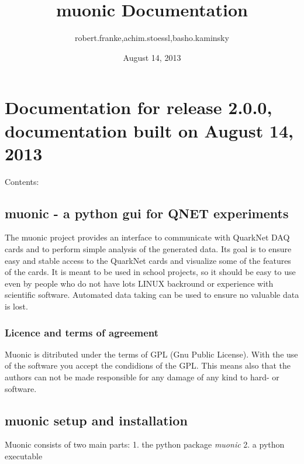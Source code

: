 \documentclass[letterpaper,10pt,english]{sphinxmanual}
\title{muonic Documentation}
\date{August 14, 2013}
\author{robert.franke,achim.stoessl,basho.kaminsky}
\begin{document}
\maketitle
\tableofcontents
{}\label{index::doc}



\chapter{Documentation for release 2.0.0, documentation built on August 14, 2013}
\label{index:welcome-to-muonic-documentation}\label{index:documentation-for-release-release-documentation-built-on-today}
Contents:


\section{muonic - a python gui for QNET experiments}
\label{intro::doc}\label{intro:muonic-a-python-gui-for-qnet-experiments}
The muonic project provides an interface to communicate with QuarkNet DAQ cards and to perform simple analysis of the generated data.
Its goal is to ensure easy and stable access to the QuarkNet cards and visualize some of the features of the cards. It is meant to be used in school projects, so it should be easy to use even by people who do not have lots LINUX backround or experience with scientific software. Automated data taking can be used to ensure no valuable data is lost.


\subsection{Licence and terms of agreement}
\label{intro:licence-and-terms-of-agreement}
Muonic is ditributed under the terms of GPL (Gnu Public License). With the use of the software you accept the condidions of the GPL. This means also that the authors can not be made responsible for any damage of any kind to hard- or software.


\section{muonic setup and installation}
\label{setup::doc}\label{setup:muonic-setup-and-installation}
Muonic consists of two main parts:
1. the python package \emph{muonic}
2. a python executable
\end{document}
